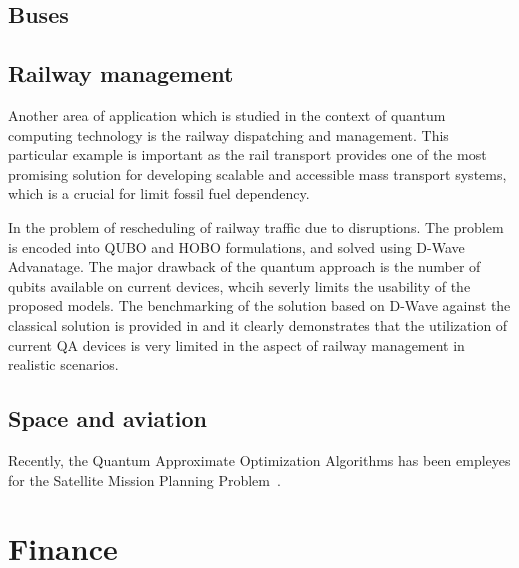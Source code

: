 \documentclass[a4paper,11pt]{article}
\begin{document}
\cite{correll2023quantum}


\subsection{Buses}
 \cite{yarkoni2020quantum}

 
\subsection{Railway management}

Another area of application which is studied in the context of quantum computing technology is the railway dispatching and management. This particular example is important as the rail transport provides one of the most promising solution for developing scalable and accessible mass transport systems, which is a crucial for limit fossil fuel dependency.


In \cite{domino2022quadratic} the problem of rescheduling of railway traffic due to disruptions. The problem is encoded into QUBO and HOBO formulations, and solved using D-Wave Advanatage. The major drawback of the quantum approach is the number of qubits available on current devices, whcih severly limits the usability of the proposed models. The benchmarking of the solution based on D-Wave against the classical solution is provided in \cite{domino2023quantum} and it clearly demonstrates that the utilization of current QA devices is very limited in the aspect of railway management in realistic scenarios. 


\subsection{Space and aviation}

Recently, the Quantum Approximate Optimization Algorithms has been empleyes for the Satellite Mission Planning Problem~\cite{quetschlich2023satellite}.

\section{Finance}
\end{document}
